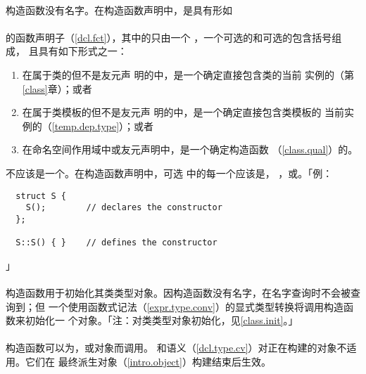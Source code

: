 \paragraph{}
构造函数没有名字。在构造函数声明中，是具有形如                 \\
\mbox{}       \\
的函数声明子（\ref{dcl.fct}），其中的只由一个
，一个可选的和可选的包含括号组成，
且具有如下形式之一：
\begin{enumerate}
  \item{在属于类的但不是友元声
    明的中，是一个确定直接包含类的当前
    实例的（第\ref{class}章）；或者}
  \item{在属于类模板的但不是友元声
    明的中，是一个确定直接包含类模板的
    当前实例的（\ref{temp.dep.type}）；或者}
  \item{在命名空间作用域中或友元声明中，是一个确定构造函数
    （\ref{class.qual}）的。}
\end{enumerate}
不应该是一个。在构造函数声明中，可选
中的每一个应该是，
，或。「例：
\begin{lstlisting}
  struct S {
    S();        // declares the constructor
  };

  S::S() { }    // defines the constructor
\end{lstlisting}」

\paragraph{}
构造函数用于初始化其类类型对象。因构造函数没有名字，在名字查询时不会被查询到；但
一个使用函数式记法（\ref{expr.type.conv}）的显式类型转换将调用构造函数来初始化一
个对象。「注：对类类型对象初始化，见\ref{class.init}。」

\paragraph{}
构造函数可以为，或对象而调用。
和语义（\ref{dcl.type.cv}）对正在构建的对象不适用。它们在
最终派生对象（\ref{intro.object}）构建结束后生效。

